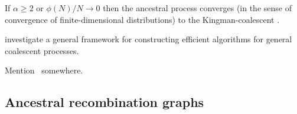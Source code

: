 \documentclass{article}
\newcommand{\IN}{\ensuremath{\mathds{N}}}%
\newcommand{\one}[1]{\ensuremath{\mathds{1}_{\left\{ #1 \right\}}}}%
\begin{document}
If $\alpha \ge 2$ or $\phi(N)/N \to 0$ then  the  ancestral process converges 
(in the sense of convergence of  finite-dimensional distributions) 
to  the Kingman-coalescent \citep{CDEE2020,AEKKZ2020}.  



\cite{Becheler2020}  investigate a general framework for  constructing efficient algorithms for general  coalescent processes.   


\begin{comment}%
A coalescent process is a continuous-time Markov process taking values among the
partitions of $\IN := \{1,2, \ldots \}$, such that the restriction to
any finite $n \in \IN $ takes values among partitions of
$[n] := \{1, 2, \ldots, n\}$.  Write $\one{A} = 1$ if $A$ holds, and zero otherwise.   Let $\cP_n$ denote the set of
partitions of $[n]$.  In the classical Kingman-coalescent, the only
possible transitions are the mergers of pairs of blocks (elements of a
partition $\pi \in \cP_n$), one pair at a time.  The $n$ leaves
(corresponding to the sampled DNA sequences) are arbitrarily labelled
from 1 to $n$, and  the blocks of a partition represent the common ancestors
of the labels of each block.    The initial state is  (usually) taken as 
$\{ \{1\}, \ldots, \{n\}\}$, and the final state, i.e.\ when the most 
recent common ancester is reached, as $\{ [n]\}$. A block in a partition of
$[n]$ represents an ancestor of the leaves in the block, i.e.\ the block
$\{i_1, \ldots, i_k\}$ in a given partition of $[n]$ is an ancestor of the
$k$ leaves $i_1, \ldots, i_k \in [n]$, and the leaves  correspond to
arbitrarily labelled DNA sequences in the sample.  
\end{comment}



Mention~\citep{becheler2020occupancy} somewhere.

\subsection*{Ancestral recombination graphs}
\end{document}
